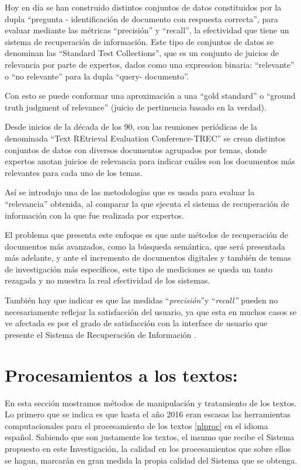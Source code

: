 \documentclass[
  12pt,
  openany]{book}
\begin{document}
Hoy en día se han construido distintos conjuntos de datos constituidos por la dupla ``pregunta - identificación de documento con respuesta correcta'', para evaluar mediante las métricas ``precisión'' y ``recall'', la efectividad que tiene un sistema de recuperación de información. Este tipo de conjuntos de datos se denominan las ``Standard Test Collections'', que es un conjunto de juicios de relevancia por parte de expertos, dados como una expression binaria: ``relevante'' o ``no relevante'' para la dupla ``query- documento''.

Con esto se puede conformar una aproximación a una ``gold standard'' o ``ground truth judgment of relevance'' (juicio de pertinencia basado en la verdad).

Desde inicios de la década de los 90, con las reuniones periódicas de la denominada ``Text REtrieval Evaluation Conference-TREC'' se crean distintos conjuntos de datos con diversos documentos agrupados por temas, donde expertos anotan juicios de relevancia para indicar cuáles son los documentos más relevantes para cada uno de los temas.

Así se introdujo una de las metodologías que es usada para evaluar la ``relevancia'' obtenida, al comparar la que ejecuta el sistema de recuperación de información con la que fue realizada por expertos.

El problema que presenta este enfoque es que ante métodos de recuperación de documentos más avanzados, como la búsqueda semántica, que será presentada más adelante, y ante el incremento de documentos digitales y también de temas de investigación más específicos, este tipo de mediciones se queda un tanto rezagada y no muestra la real efectividad de los sistemas.

También hay que indicar es que las medidas ``\emph{precisión}''y ``\emph{recall''} pueden no necesariamente reflejar la satisfacción del usuario, ya que esta en muchos casos se ve afectada es por el grado de satisfacción con la interface de usuario que presente el Sistema de Recuperación de Información \citep{manning2008}.

\hypertarget{PT}{%
\section{Procesamientos a los textos:}\label{PT}}

En esta sección mostramos métodos de manipulación y tratamiento de los textos. Lo primero que se indica es que hasta el año 2016 eran escasas las herramientas computacionales para el procesamiento de los textos \ref{nlproc} en el idioma español. Sabiendo que son justamente los textos, el insumo que recibe el Sistema propuesto en este Investigación, la calidad en los procesamientos que sobre ellos se hagan, marcarán en gran medida la propia calidad del Sistema que se obtenga.
\end{document}

